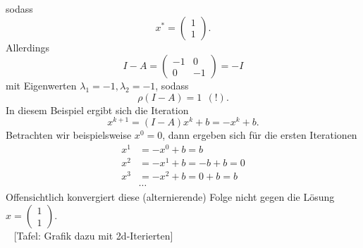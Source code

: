 sodass $$x^* = \begin{pmatrix}1\\1\end{pmatrix}.$$
Allerdings
$$I - A =  \begin{pmatrix}-1&0\\0&-1\end{pmatrix} = -I$$
mit Eigenwerten $\lambda_1 = -1, \lambda_2 = -1$, sodass 
$$\rho(I-A) = 1 ~~(!). $$ In diesem Beispiel ergibt sich die Iteration
$$x^{k+1} = (I-A)x^k+b = -x^k+b.$$
Betrachten wir beispielsweise $x^0 = 0$, dann ergeben sich für die ersten Iterationen
\begin{align*}
x^1 &= -x^0 + b = b\\
x^2 &= -x^1 + b = -b +b = 0\\
x^3 &= -x^2 + b = 0 +b = b \\
 &\cdots
\end{align*}
Offensichtlich konvergiert diese (alternierende) Folge nicht gegen die Lösung $x = \begin{pmatrix}1\\1\end{pmatrix}$.\\~ [Tafel: Grafik dazu mit 2d-Iterierten]
%
